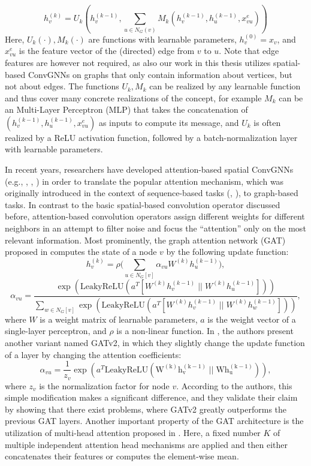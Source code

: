 \documentclass[draft,final]{vutinfth} %
\begin{document}
\[
    h_v^{(k)} = U_k (h_v^{(k-1)}, \sum_{u \in N_G(v)} M_k(h_v^{(k-1)}, h_u^{(k-1)}, x_{vu}^{e}))
\]
Here, $U_k(\cdot), M_k(\cdot)$ are functions with learnable parameters, $h_v^{(0)} = x_v$, and $x_{vu}^{e}$ is the feature vector of the (directed) edge from $v$ to $u$. Note that edge features are however not required, as also our work in this thesis utilizes spatial-based ConvGNNs on graphs that only contain information about vertices, but not about edges. 
The functions $U_k, M_k$ can be realized by any learnable function and thus cover many concrete realizations of the concept, for example $M_k$ can be an Multi-Layer Perceptron (MLP) that takes the concatenation of $(h_v^{(k-1)}, h_u^{(k-1)}, x_{vu}^{e})$ as inputs to compute its message, and $U_k$ is often realized by a ReLU activation function, followed by a batch-normalization \cite{IoffeS15} layer with learnable parameters. 

In recent years, researchers have developed attention-based spatial ConvGNNs (e.g., \cite{Velickovic2018}, \cite{Zhang2018}, \cite{Brody2021}) in order to translate the popular attention mechanism, which was originally introduced in the context of sequence-based tasks (\cite{Bahdanau2015}, \cite{VaswaniSPUJGKP17}), to graph-based tasks. In contrast to the basic spatial-based convolution operator discussed before, attention-based convolution operators assign different weights for different neighbors in an attempt to filter noise and focus the ``attention'' only on the most relevant information. 
Most prominently, the graph attention network (GAT) proposed in \cite{Velickovic2018} computes the state of a node $v$ by the following update function: 
\[
    h_v^{(k)} = \rho \big( \sum_{u \in N_G[v]} \alpha_{vu} W^{(k)} h_u^{(k-1)} \big),
\]
\[ 
    \alpha_{vu} = \frac{\exp(\mathrm{LeakyReLU}(a^T[W^{(k)}h_v^{(k-1)} \; || \; W^{(k)}h_u^{(k-1)}]))}
    {\sum_{w \in N_G[v]} \exp(\mathrm{LeakyReLU}(a^T[W^{(k)}h_v^{(k-1)} \; ||\; W^{(k)}h_w^{(k-1)}]))},
\]
where $W$ is a weight matrix of learnable parameters, $a$ is the weight vector of a single-layer perceptron, and $\rho$ is a non-linear function. 
In \cite{Brody2021}, the authors present another variant named GATv2, in which they slightly change the update function of a layer by changing the attention coefficients:  
\[
    \alpha_{vu} = \frac{1}{z_v} \exp(a^T \mathrm{LeakyReLU(W^{(k)}h_v^{(k-1)} \; || \; W h_u^{(k-1)} )}), 
\]
where $z_v$ is the normalization factor for node $v$.
According to the authors, this simple modification makes a significant difference, and they validate their claim by showing that there exist problems, where GATv2 greatly outperforms the previous GAT layers. 
Another important property of the GAT architecture is the utilization of multi-head attention proposed in \cite{VaswaniSPUJGKP17}. 
Here, a fixed number $K$ of multiple independent attention head mechanisms are applied and then either concatenates their features or computes the element-wise mean. 
\end{document}
